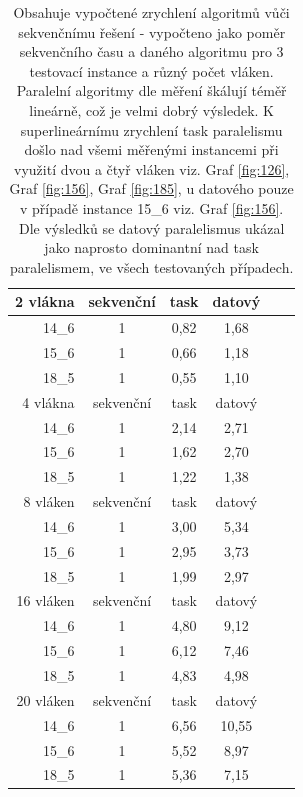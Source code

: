 \documentclass{article}%
\begin{document}
\begin{table}[ht]%
    \begin{center}%
        \begin{tabular}{r|ccccc}%
            2 vlákna  & sekvenční & task & datový \\
            \hline%
            14\_6     & 1         & 0,82 & 1,68   \\
            15\_6     & 1         & 0,66 & 1,18   \\
            18\_5     & 1         & 0,55 & 1,10   \\
            \hline%
            4 vlákna  & sekvenční & task & datový \\
            \hline%
            14\_6     & 1         & 2,14 & 2,71   \\
            15\_6     & 1         & 1,62 & 2,70   \\
            18\_5     & 1         & 1,22 & 1,38   \\
            \hline%
            8 vláken  & sekvenční & task & datový \\
            \hline%
            14\_6     & 1         & 3,00 & 5,34   \\
            15\_6     & 1         & 2,95 & 3,73   \\
            18\_5     & 1         & 1,99 & 2,97   \\
            \hline%
            16 vláken & sekvenční & task & datový \\
            \hline%
            14\_6     & 1         & 4,80 & 9,12   \\
            15\_6     & 1         & 6,12 & 7,46   \\
            18\_5     & 1         & 4,83 & 4,98   \\
            \hline%
            20 vláken & sekvenční & task & datový \\
            \hline%
            14\_6     & 1         & 6,56 & 10,55  \\
            15\_6     & 1         & 5,52 & 8,97   \\
            18\_5     & 1         & 5,36 & 7,15   \\
        \end{tabular}%
        \caption{Obsahuje vypočtené zrychlení algoritmů vůči sekvenčnímu řešení - vypočteno jako poměr sekvenčního času a daného algoritmu pro 3 testovací instance a různý počet vláken. Paralelní algoritmy dle měření škálují téměř lineárně, což je velmi dobrý výsledek. K superlineárnímu zrychlení task paralelismu došlo nad všemi měřenými instancemi při využití dvou a čtyř vláken viz. Graf \ref{fig:126}, Graf \ref{fig:156}, Graf \ref{fig:185}, u datového pouze v případě instance 15\_6 viz. Graf \ref{fig:156}. Dle výsledků se datový paralelismus ukázal jako naprosto dominantní nad task paralelismem, ve všech testovaných případech.}%
    \end{center}%
\end{table}
\end{document}
